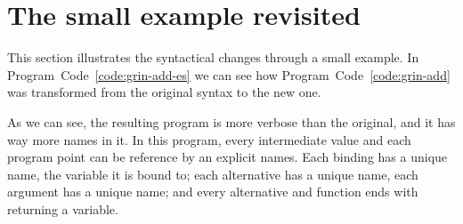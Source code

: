 \documentclass[main.tex]{subfiles}
\begin{document}
	

  \section{The small example revisited}
  
  This section illustrates the syntactical changes through a small example. In Program~Code~\ref{code:grin-add-es} we can see how Program~Code~\ref{code:grin-add} was transformed from the original syntax to the new one.

	As we can see, the resulting program is more verbose than the original, and it has way more names in it. In this program, every intermediate value and each program point can be reference by an explicit names. Each binding has a unique name, the variable it is bound to; each alternative has a unique name, each argument has a unique name; and every alternative and function ends with returning a variable.
\end{document}
